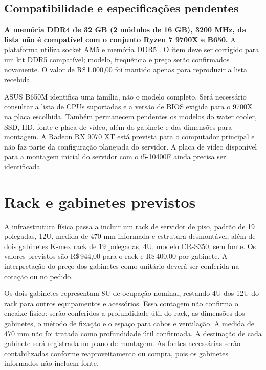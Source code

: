 \documentclass[11pt,a4paper,oneside]{report}
\newcommand{\dinheiro}[1]{R\$\,#1}
\begin{document}
\subsection{Compatibilidade e especificações pendentes}
\textbf{A memória DDR4 de 32 GB (2 módulos de 16 GB), 3200 MHz, da lista não é
compatível com o conjunto Ryzen 7 9700X e B650.} A plataforma utiliza socket
AM5 e memória DDR5 \cite{ryzen9700,asusb650}. O item deve ser corrigido para
um kit DDR5 compatível; modelo, frequência e preço serão confirmados novamente.
O valor de \dinheiro{1.000,00} foi mantido apenas para reproduzir a lista recebida.

ASUS B650M identifica uma família, não o modelo completo. Será necessário
consultar a lista de CPUs suportadas e a versão de BIOS exigida para o 9700X
na placa escolhida. Também permanecem pendentes os modelos do water cooler,
SSD, HD, fonte e placa de vídeo, além do gabinete e das dimensões para montagem.
A Radeon RX 9070 XT está prevista para o computador principal e não faz parte
da configuração planejada do servidor. A placa de vídeo disponível para a
montagem inicial do servidor com o i5-10400F ainda precisa ser identificada.

\section{Rack e gabinetes previstos}
A infraestrutura física passa a incluir um rack de servidor de piso,
padrão de 19 polegadas, 12U, medida de 470 mm informada e estrutura desmontável,
além de dois gabinetes K-mex rack de 19 polegadas, 4U, modelo CR-S350, sem fonte.
Os valores previstos são \dinheiro{944,00} para o rack e \dinheiro{400,00}
por gabinete. A interpretação do preço dos gabinetes como unitário deverá
ser conferida na cotação ou no pedido.

Os dois gabinetes representam 8U de ocupação nominal, restando 4U dos 12U
do rack para outros equipamentos e acessórios. Essa contagem não confirma
o encaixe físico: serão conferidos a profundidade útil do rack, as dimensões
dos gabinetes, o método de fixação e o espaço para cabos e ventilação.
A medida de 470 mm não foi tratada como profundidade útil confirmada.
A destinação de cada gabinete será registrada no plano de montagem.
As fontes necessárias serão contabilizadas conforme reaproveitamento ou compra,
pois os gabinetes informados não incluem fonte.
\end{document}
